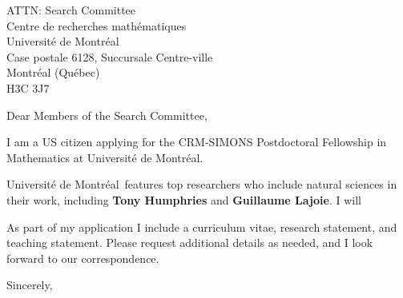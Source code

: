 \documentclass[11pt,a4paper]{letter}
\begin{document}

\def\School{Universit\'{e} de Montr\'{e}al}
\begin{letter}
{ATTN: Search Committee\\
Centre de recherches mathématiques\\
Université de Montréal\\
Case postale 6128, Succursale Centre-ville\\
Montréal (Québec)\\
H3C 3J7
}


\opening{Dear Members of the Search Committee,}

I am a US citizen applying for the CRM-SIMONS Postdoctoral Fellowship in Mathematics at \School. 



\School~features top researchers who include natural sciences in their work, including \textbf{Tony Humphries} and \textbf{Guillaume Lajoie}. I will 



As part of my application I include a curriculum vitae, research statement, and teaching statement. Please request additional details as needed, and I look forward to our correspondence.

\closing{Sincerely,}
\end{letter}
\end{document}
